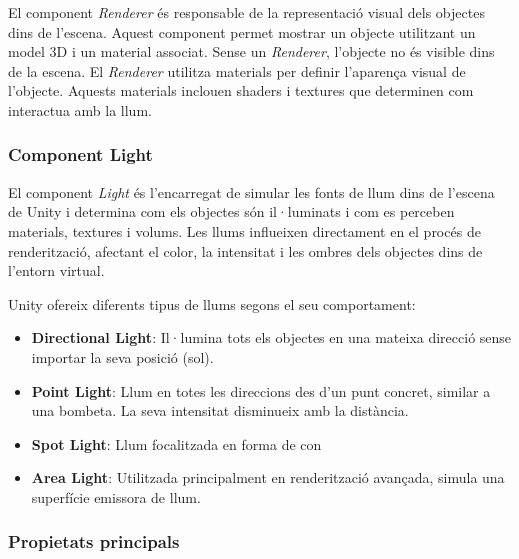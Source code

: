 \documentclass[a4paper,11pt,DIV=13,headings=normal,abstract=true,twoside=semi]{article}
\begin{document}
El component \textit{Renderer} \cite{UnityRenderer} és responsable de la representació visual dels objectes dins de l'escena. Aquest component permet mostrar un objecte utilitzant un model 3D i un material associat. Sense un \textit{Renderer}, l'objecte no és visible dins de la escena. El \textit{Renderer} utilitza materials per definir l'aparença visual de l'objecte. Aquests materials inclouen shaders i textures que determinen com interactua amb la llum.


\subsubsection{Component Light}
\label{sec:lights}

El component \textit{Light} \cite{UnityLighting} és l'encarregat de simular les fonts de llum dins de l'escena de Unity i determina com els objectes són il·luminats i com es perceben materials, textures i volums. Les llums influeixen directament en el procés de renderització, afectant el color, la intensitat i les ombres dels objectes dins de l'entorn virtual.


Unity ofereix diferents tipus de llums segons el seu comportament:

\begin{itemize}
\item \textbf{Directional Light}: Il·lumina tots els objectes en una mateixa direcció sense importar la seva posició (sol).

\item \textbf{Point Light}: Llum en totes les direccions des d'un punt concret, similar a una bombeta. La seva intensitat disminueix amb la distància.

\item \textbf{Spot Light}: Llum focalitzada en forma de con

\item \textbf{Area Light}:  
Utilitzada principalment en renderització avançada, simula una superfície emissora de llum.
\end{itemize}

\subsubsection*{Propietats principals}
\end{document}
